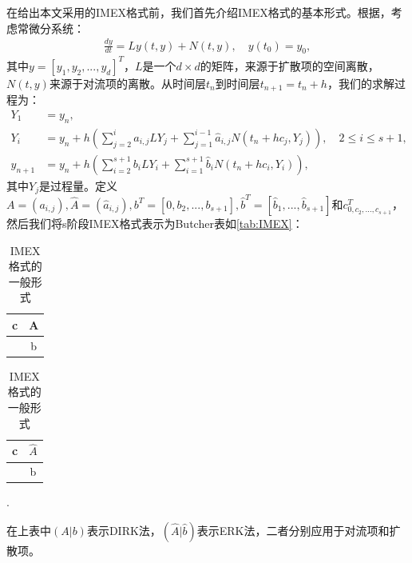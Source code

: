 在给出本文采用的IMEX格式前，我们首先介绍IMEX格式的基本形式。根据\parencite{calvo2001linearly}，考虑常微分系统：
\begin{align}
	\frac{dy}{dt} = Ly(t,y) + N(t,y), \quad y(t_0) = y_0,
\end{align}
其中$y = [y_1, y_2, ..., y_d]^T$，$L$是一个$d\times d$的矩阵，来源于扩散项的空间离散，$N(t,y)$来源于对流项的离散。从时间层$t_n$到时间层$t_{n+1}=t_n+h$，我们的求解过程为：
\begin{align*}
	Y_1     & =y_n,                                                                                                        \\
	Y_i     & = y_n + h(\sum_{j=2}^i a_{i,j}LY_j + \sum_{j=1}^{i-1}\hat{a}_{i,j}N(t_n+hc_j,Y_j)), \quad 2 \leq i \leq s+1, \\
	y_{n+1} & = y_n + h(\sum_{i=2}^{s+1}b_iLY_i+\sum_{i=1}^{s+1}\hat{b}_iN(t_n+hc_i, Y_i)),
\end{align*}
其中$Y_j$是过程量。定义$A = (a_{i,j}), \hat{A} = (\hat{a}_{i,j}), b^T = [0, b_2, ..., b_{s+1}], \hat{b}^T=[\hat{b}_1,...,\hat{b}_{s+1}]$和$c^T_{0, c_2, ..., c_{s+1}}$，然后我们将s阶段IMEX格式表示为Butcher表如\autoref{tab:IMEX}：
\begin{table}
	\centering
	\begin{minipage}{0.45\linewidth}
		\centering
		\begin{tabular}{c|c}
			c & A \\
			\hline
			  & b
		\end{tabular}
	\end{minipage}
	\begin{minipage}{0.45\linewidth}
		\centering
		\begin{tabular}{c|c}
			c & $\hat{A}$ \\
			\hline
			  & b
		\end{tabular}.
	\end{minipage}
	\caption{IMEX格式的一般形式}
	\label{tab:IMEX}
\end{table}
在上表中$(A|b)$表示DIRK法，$(\hat{A}|\hat{b})$表示ERK法，二者分别应用于对流项和扩散项。

